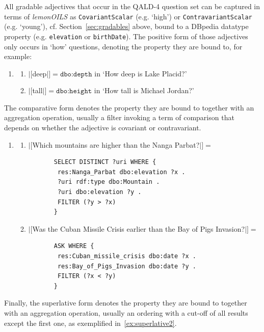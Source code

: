 \documentclass[11pt]{article}
\begin{document}
{All gradable adjectives that occur in the QALD-4 question set can be captured in terms of \emph{lemonOILS} 
as \texttt{CovariantScalar} (e.g. `high') or \texttt{ContravariantScalar} (e.g. `young'), cf. Section~\ref{sec:gradables} above, 
bound to a DBpedia datatype property (e.g. \texttt{elevation} or \texttt{birthDate}). 
The positive form of those adjectives only occurs in `how' questions, denoting the property they are bound to, for example:
\begin{enumerate}[resume] 
\item \begin{enumerate}
 \item $|[$deep$|]=\texttt{dbo:depth}$ in `How deep is Lake Placid?'
 \item $|[$tall$|]=\texttt{dbo:height}$ in `How tall is Michael Jordan?'
 \end{enumerate}
\end{enumerate}
The comparative form denotes the property they are bound to together with an aggregation operation, usually a filter 
invoking a term of comparison that depends on whether the adjective is covariant or contravariant.
\begin{enumerate}[resume]
\item \begin{enumerate}
 \item $|[$Which mountains are higher than the Nanga Parbat?$|]=$
       \begin{verbatim}
       SELECT DISTINCT ?uri WHERE { 
        res:Nanga_Parbat dbo:elevation ?x .
        ?uri rdf:type dbo:Mountain .
        ?uri dbo:elevation ?y . 
        FILTER (?y > ?x) 
       }
       \end{verbatim} 
 \item $|[$Was the Cuban Missile Crisis earlier than the Bay of Pigs Invasion?$|]=$ 
       \begin{verbatim}
       ASK WHERE {
        res:Cuban_missile_crisis dbo:date ?x . 
        res:Bay_of_Pigs_Invasion dbo:date ?y . 
        FILTER (?x < ?y) 
       }
       \end{verbatim}
\end{enumerate}
\end{enumerate}
Finally, the superlative form denotes the property they are bound to together with an aggregation operation, 
usually an ordering with a cut-off of all results except the first one, as exemplified in~\ref{ex:superlative2}. 
}
\end{document}
